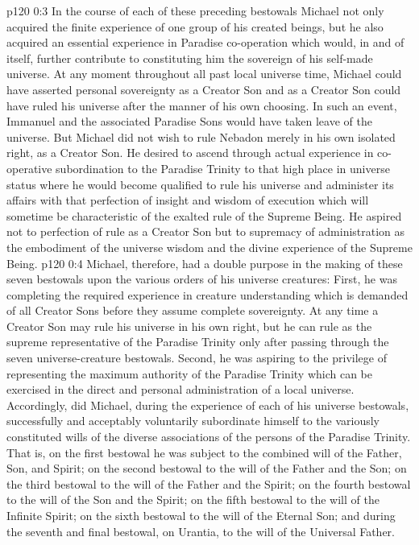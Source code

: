 \vs p120 0:3 In the course of each of these preceding bestowals Michael not only acquired the finite experience of one group of his created beings, but he also acquired an essential experience in Paradise co\hyp{}operation which would, in and of itself, further contribute to constituting him the sovereign of his self\hyp{}made universe. At any moment throughout all past local universe time, Michael could have asserted personal sovereignty as a Creator Son and as a Creator Son could have ruled his universe after the manner of his own choosing. In such an event, Immanuel and the associated Paradise Sons would have taken leave of the universe. But Michael did not wish to rule Nebadon merely in his own isolated right, as a Creator Son. He desired to ascend through actual experience in co\hyp{}operative subordination to the Paradise Trinity to that high place in universe status where he would become qualified to rule his universe and administer its affairs with that perfection of insight and wisdom of execution which will sometime be characteristic of the exalted rule of the Supreme Being. He aspired not to perfection of rule as a Creator Son but to supremacy of administration as the embodiment of the universe wisdom and the divine experience of the Supreme Being.
\vs p120 0:4 Michael, therefore, had a double purpose in the making of these seven bestowals upon the various orders of his universe creatures: First, he was completing the required experience in creature understanding which is demanded of all Creator Sons before they assume complete sovereignty. At any time a Creator Son may rule his universe in his own right, but he can rule as the supreme representative of the Paradise Trinity only after passing through the seven universe\hyp{}creature bestowals. Second, he was aspiring to the privilege of representing the maximum authority of the Paradise Trinity which can be exercised in the direct and personal administration of a local universe. Accordingly, did Michael, during the experience of each of his universe bestowals, successfully and acceptably voluntarily subordinate himself to the variously constituted wills of the diverse associations of the persons of the Paradise Trinity. That is, on the first bestowal he was subject to the combined will of the Father, Son, and Spirit; on the second bestowal to the will of the Father and the Son; on the third bestowal to the will of the Father and the Spirit; on the fourth bestowal to the will of the Son and the Spirit; on the fifth bestowal to the will of the Infinite Spirit; on the sixth bestowal to the will of the Eternal Son; and during the seventh and final bestowal, on Urantia, to the will of the Universal Father.
